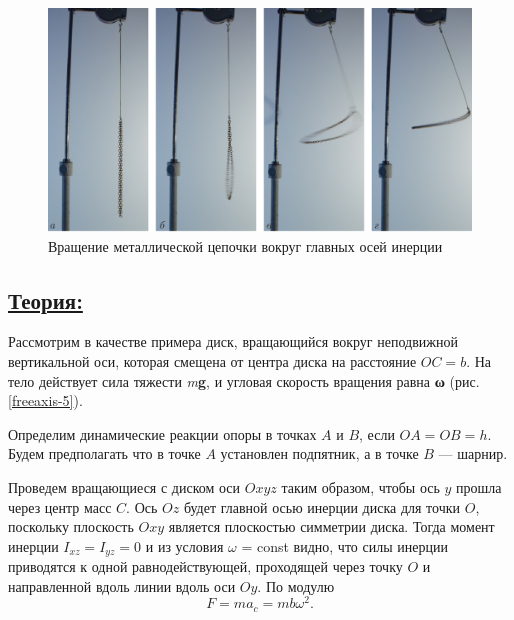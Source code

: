 \documentclass[14pt,a4paper,oneside]{extarticle}	%
\begin{document}
\begin{figure}[H]
	\centering 	
	\includegraphics[width=0.9\linewidth]{freeaxis-4.png}
	\caption{Вращение металлической цепочки вокруг главных осей инерции}
	\label{freeaxis-4}
\end{figure}

\newpage
\subsection*{\underline{Теория:}}

Рассмотрим в качестве примера диск, вращающийся вокруг неподвижной вертикальной оси, которая смещена от центра диска на расстояние $ OC=b $. 
На тело действует сила тяжести \textit{m}\textbf{g}, и угловая скорость вращения равна \textbf{ω} (рис.\ref{freeaxis-5}).

Определим динамические реакции опоры в точках $ A $ и $ B $, если $ OA = OB = h $.
Будем предполагать что в точке $ A $ установлен подпятник, а в точке $ B $ — шарнир.

Проведем вращающиеся с диском оси $ Oxyz $ таким образом, чтобы ось $ y $ прошла через центр масс $ C $.
Ось $ Oz $ будет главной осью инерции диска для точки $ O $, поскольку плоскость $ Oxy $ является плоскостью симметрии диска.
Тогда момент инерции $ I_{xz} = I_{yz} = 0 $ и из условия $ \omega $ = const видно, что силы инерции приводятся к одной равнодействующей, проходящей через точку $ O $ и направленной вдоль линии вдоль оси $Oy$.
По модулю $$ F = ma_{c} = mb\omega^{2}. $$
\end{document}
